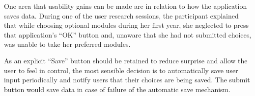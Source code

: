 \documentclass[draft]{scrartcl}
\begin{document}



One area that usability gains can be made are in relation to how the
application saves data. During one of the user research sessions, the
participant explained that while choosing optional modules during her first
year, she neglected to press that application's ``OK'' button and, unaware
that she had not submitted choices, was unable to take her preferred modules.

As an explicit ``Save'' button should be retained to reduce surprise and allow
the user to feel in control, the most sensible decision is to automatically
save user input periodically and notify users that their choices are being
saved. The submit button would save data in case of failure of the automatic
save mechanism.
\end{document}
